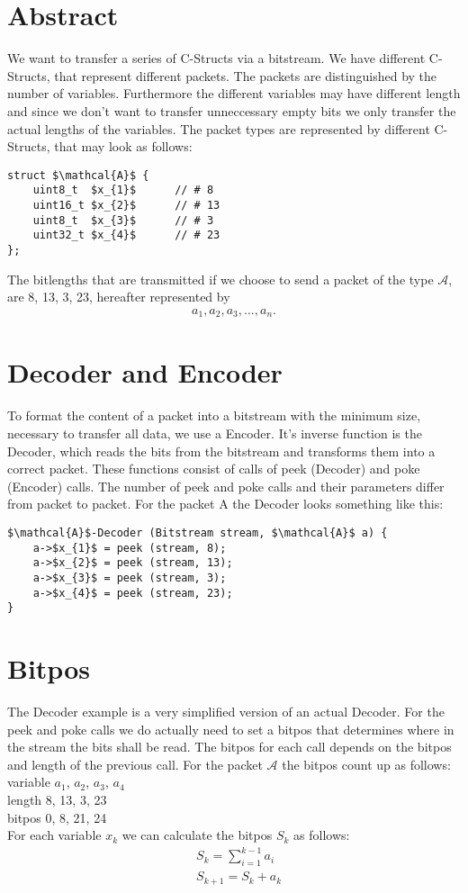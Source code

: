 \documentclass{article}
\begin{document}
	\section{Abstract}
		We want to transfer a series of C-Structs via a bitstream. We have different C-Structs, that represent different packets. The packets are distinguished by the number of variables.
		Furthermore the different variables may have different length and since we don't want to transfer unneccessary empty bits we only transfer the actual lengths of the variables.
		The packet types are represented by different C-Structs, that may look as follows:
		\begin{lstlisting}[mathescape]
struct $\mathcal{A}$ {
	uint8_t  $x_{1}$      // # 8
	uint16_t $x_{2}$      // # 13
	uint8_t  $x_{3}$      // # 3
	uint32_t $x_{4}$      // # 23
};
		\end{lstlisting}
		The bitlengths that are transmitted if we choose to send a packet of the type $\mathcal{A}$, are 8, 13, 3, 23, hereafter represented by 
		\begin{align*}
			a_{1}, a_{2}, a_{3}, ... , a_{n}.
		\end{align*}
	\section{Decoder and Encoder}
		To format the content of a packet into a bitstream with the minimum size, necessary to transfer all data, we use a Encoder. It's inverse function is the Decoder, which reads the bits
		from the bitstream and transforms them into a correct packet.
		These functions consist of calls of peek (Decoder) and poke (Encoder) calls. The number of peek and poke calls and their parameters differ from packet to packet.
		For the packet A the Decoder looks something like this:
		\begin{lstlisting}[mathescape]
$\mathcal{A}$-Decoder (Bitstream stream, $\mathcal{A}$ a) {
	a->$x_{1}$ = peek (stream, 8);
	a->$x_{2}$ = peek (stream, 13);
	a->$x_{3}$ = peek (stream, 3);
	a->$x_{4}$ = peek (stream, 23);
}
		\end{lstlisting}
	\section{Bitpos}
		The Decoder example is a very simplified version of an actual Decoder. For the peek and poke calls we do actually need to set a bitpos
		that determines where in the stream the bits shall be read. The bitpos for each call depends on the bitpos and length of the previous call.
		For the packet $\mathcal{A}$ the bitpos count up as follows:\\
		variable   $a_{1}$, $a_{2}$, $a_{3}$, $a_{4}$\\
		length      8, 13,  3, 23\\
		bitpos      0,  8, 21, 24\\
		For each variable $x_{k}$ we can calculate the bitpos $S_{k}$ as follows:
		\begin{align*}
			&S_{k} = \sum_{i=1}^{k-1} a_{i}\\
			&S_{k+1} = S_{k} + a_{k}
		\end{align*}
\end{document}
